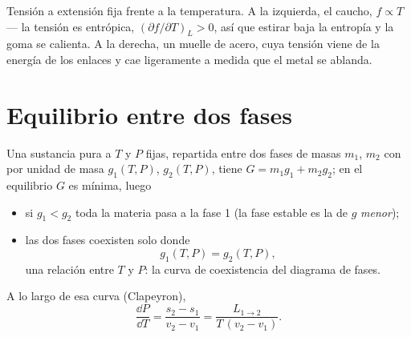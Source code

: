 \begin{omfigure}

{\small Tensión a extensión fija frente a la temperatura. A la izquierda, el caucho,
$f \propto T$ --- la tensión es entrópica, $(\partial f/\partial T)_L > 0$,
así que estirar baja la entropía y la goma se calienta. A la derecha, un muelle
de acero, cuya tensión viene de la energía de los enlaces y cae ligeramente
a medida que el metal se ablanda.}
\end{omfigure}

\section{Equilibrio entre dos fases}

\begin{theorem}\label{thm:b2:thermodynamic-potentials:coexistence}
Una sustancia pura a $T$ y $P$ fijas, repartida entre dos fases de
masas $m_1$, $m_2$ con  por unidad de masa $g_1(T,P)$,
$g_2(T,P)$, tiene $G = m_1g_1 + m_2g_2$; en el equilibrio $G$ es mínima, luego
\begin{itemize}
\item si $g_1 < g_2$ toda la materia pasa a la fase 1 (la fase estable
      es la de $g$ \emph{menor});
\item las dos fases coexisten solo donde
      \[
      g_1(T,P) = g_2(T,P) ,
      \]
      una relación entre $T$ y $P$: la curva de coexistencia del diagrama
      de fases.
\end{itemize}
A lo largo de esa curva (Clapeyron),
\[
\frac{\dd P}{\dd T} = \frac{s_2 - s_1}{v_2 - v_1} = \frac{L_{1\to2}}{T\,(v_2 - v_1)} .
\]
\end{theorem}

